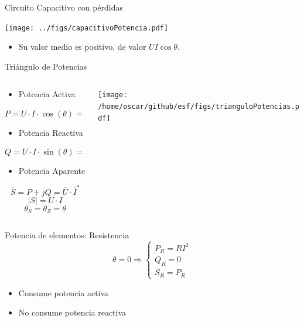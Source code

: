 \documentclass[xcolor={usenames,svgnames,dvipsnames}]{beamer}
\begin{document}
\begin{frame}[label={sec:org2832c9c}]{Circuito Capacitivo con pérdidas}
\begin{center}
\texttt{[image: ../figs/capacitivoPotencia.pdf]}
\end{center}

\begin{itemize}
\item Su valor medio es positivo, de valor \(U I \cos \theta\).
\end{itemize}
\end{frame}

\begin{frame}[label={sec:org555b91d}]{Triángulo de Potencias}
\begin{columns}
\begin{column}{0.4\columnwidth}
\begin{itemize}
\item Potencia Activa
\end{itemize}
\[  
P = U\cdot I\cdot\cos(\theta) = R \cdot I^2
\]

\begin{itemize}
\item Potencia Reactiva
\end{itemize}
\[
Q = U\cdot I\cdot\sin(\theta) = X \cdot I^2
\]

\begin{itemize}
\item Potencia Aparente
\end{itemize}
\[
\overline{S} = P + jQ = \overline{U} \cdot \overline{I}^*
\]
\[
|S| = U \cdot I
\]
\[
\theta_S = \theta_Z = \theta
\]
\end{column}

\begin{column}{0.6\columnwidth}
\begin{center}
\texttt{[image: /home/oscar/github/esf/figs/trianguloPotencias.pdf]}
\end{center}
\end{column}
\end{columns}
\end{frame}

\begin{frame}[label={sec:org95ae67a}]{Potencia de elementos: Resistencia}
\[
\theta = 0 \Rightarrow 
\begin{cases}
  P_R = R I^2\\
  Q_R = 0\\
  S_R = P_R
\end{cases}
\]

\begin{itemize}
\item Consume potencia activa
\item No consume potencia reactiva
\end{itemize}
\end{frame}
\end{document}
